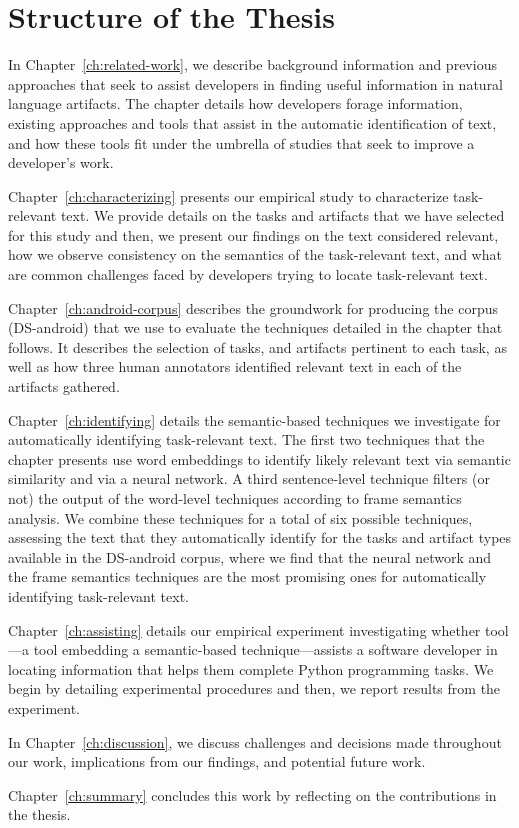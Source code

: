 \section{Structure of the Thesis}
\label{cp1:organization}


In Chapter~\ref{ch:related-work}, we describe background information 
and previous approaches that seek to assist developers in 
finding useful information in natural language artifacts. 
The chapter details 
how developers forage information, existing approaches and tools 
that assist in the automatic
identification of text, and how these tools fit under the 
umbrella of studies that seek to 
improve a developer's work.


Chapter~\ref{ch:characterizing} presents our empirical study to characterize task-relevant text.
We provide details on the tasks and artifacts that we have selected for this study
and then, we present our findings on the text considered relevant, 
how we observe consistency on the semantics of the task-relevant text,
and what are common challenges faced by developers trying to locate task-relevant text.


Chapter~\ref{ch:android-corpus} describes the groundwork 
for producing the corpus (\acs{DS-android}) that we use to evaluate the techniques 
detailed in the chapter that follows. It describes the selection of tasks, 
and 
artifacts pertinent to each task,
as well as how three human annotators identified relevant text in each of the artifacts gathered.



Chapter~\ref{ch:identifying} details the semantic-based techniques we investigate for automatically 
identifying task-relevant text.
The first two techniques that the chapter presents 
use word embeddings to identify likely relevant text via semantic similarity
and via a neural network.
A third sentence-level technique filters (or not) 
the output of the word-level techniques according to frame semantics analysis.
We combine these techniques for a total of six possible techniques, 
assessing 
the text that they automatically identify for the tasks and artifact types
available in the \acs{DS-android} corpus,
where we find that the neural network and the frame semantics techniques
are the most promising ones for automatically identifying 
task-relevant text. 




Chapter~\ref{ch:assisting} details our empirical experiment investigating 
whether \acs{tool}---a tool embedding a semantic-based technique---assists a software developer in locating information
that helps them complete Python programming tasks. We begin by detailing experimental procedures
and then, we report results from the experiment.


In Chapter~\ref{ch:discussion}, we discuss challenges and decisions 
made throughout our work, implications from our findings,
and potential future work.


Chapter~\ref{ch:summary} concludes this work by reflecting on the contributions in the thesis. 
